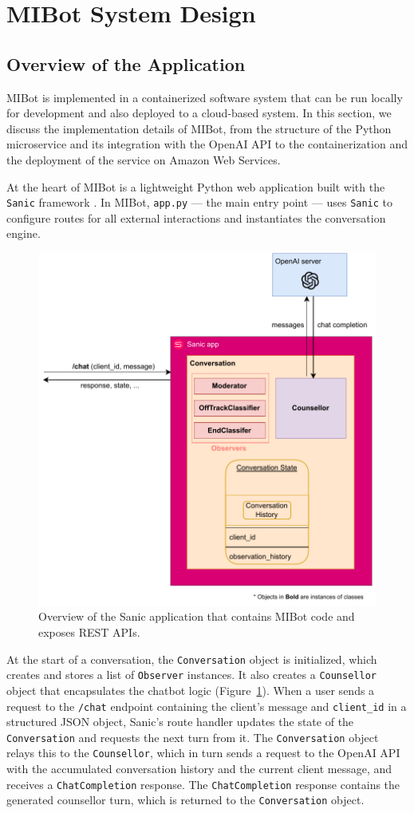 \section{MIBot System Design}
\label{sec:deployment}


\subsection{Overview of the Application}


MIBot is implemented in a containerized software system that can be run locally for development and also deployed to a cloud-based system. In this section, we discuss the implementation details of MIBot, from the structure of the Python microservice and its integration with the OpenAI API to the containerization and the deployment of the service on Amazon Web Services.

At the heart of MIBot is a lightweight Python web application built with the \texttt{Sanic} framework \cite{pi_sanic}. In MIBot, \texttt{app.py} --- the main entry point --- uses \texttt{Sanic} to configure routes for all external interactions and instantiates the conversation engine.
\begin{figure}[ht]
  \centering
  \includegraphics[width=0.7\linewidth]{fig/microservice.drawio.pdf} 
  \caption{Overview of the Sanic application that contains MIBot code and exposes REST APIs.}
  \label{fig:microservice}
\end{figure}
At the start of a conversation, the \texttt{Conversation} object is initialized, which creates and stores a list of \texttt{Observer} instances. It also creates a \texttt{Counsellor} object that encapsulates the chatbot logic (Figure~\ref{fig:microservice}). When a user sends a request to the \texttt{/chat} endpoint containing the client's message and \texttt{client\_id} in a structured JSON object, Sanic's route handler updates the state of the \texttt{Conversation} and requests the next turn from it. The \texttt{Conversation} object relays this to the \texttt{Counsellor}, which in turn sends a request to the OpenAI API with the accumulated conversation history and the current client message, and receives a \texttt{ChatCompletion} response. The \texttt{ChatCompletion} response contains the generated counsellor turn, which is returned to the \texttt{Conversation} object.

